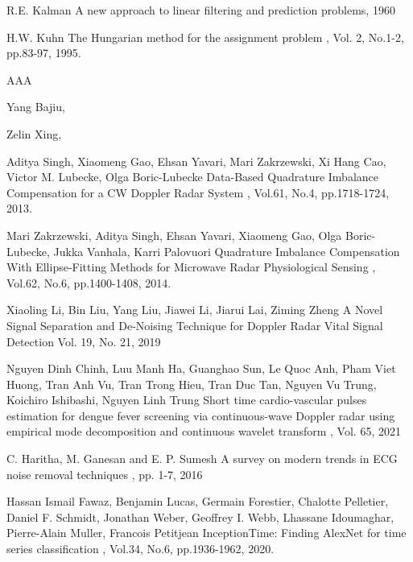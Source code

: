 \begin{bib}[100]
  R.E. Kalman
  \newblock A new approach to linear filtering and prediction problems, 1960

  H.W. Kuhn
  \newblock The Hungarian method for the assignment problem
  , Vol. 2, No.1-2, pp.83-97, 1995.

  AAA

  Yang Bajiu, 

  Zelin Xing, 
	
  Aditya Singh, Xiaomeng Gao, Ehsan Yavari, Mari Zakrzewski, Xi Hang Cao, Victor M. Lubecke, Olga Boric-Lubecke
  \newblock Data-Based Quadrature Imbalance Compensation for a CW Doppler Radar System
  , Vol.61, No.4, pp.1718-1724, 2013.

  Mari Zakrzewski, Aditya Singh, Ehsan Yavari, Xiaomeng Gao, Olga Boric-Lubecke, Jukka Vanhala, Karri Palovuori
  \newblock Quadrature Imbalance Compensation With Ellipse-Fitting Methods for Microwave Radar Physiological Sensing
  , Vol.62, No.6, pp.1400-1408, 2014.

Xiaoling Li, Bin Liu, Yang Liu, Jiawei Li, Jiarui Lai, Ziming Zheng
\newblock A Novel Signal Separation and De-Noising Technique for Doppler Radar Vital Signal Detection
 Vol. 19, No. 21, 2019

Nguyen Dinh Chinh, Luu Manh Ha, Guanghao Sun, Le Quoc Anh, Pham Viet Huong, Tran Anh Vu, Tran Trong Hieu, Tran Duc Tan, Nguyen Vu Trung, Koichiro Ishibashi, Nguyen Linh Trung
\newblock Short time cardio-vascular pulses estimation for dengue fever screening via continuous-wave Doppler radar using empirical mode decomposition and continuous wavelet transform
, Vol. 65, 2021

C. Haritha, M. Ganesan and E. P. Sumesh
\newblock A survey on modern trends in ECG noise removal techniques
, pp. 1-7, 2016 

  Hassan Ismail Fawaz, Benjamin Lucas, Germain Forestier, Chalotte Pelletier, Daniel F. Schmidt, Jonathan Weber, Geoffrey I. Webb, Lhassane Idoumaghar, Pierre-Alain Muller, Francois Petitjean
  \newblock InceptionTime: Finding AlexNet for time series classification
  , Vol.34, No.6, pp.1936-1962, 2020.


\end{bib}
